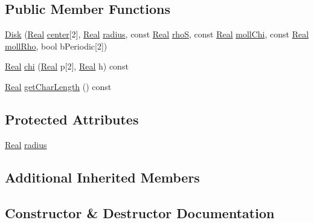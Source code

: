 \subsection*{Public Member Functions}
\begin{DoxyCompactItemize}
\item 
\hyperlink{class_disk_a8402960d71a12fb9e372d3ea1b974b92}{Disk} (\hyperlink{_h_d_f5_dumper_8h_a445a5f0e2a34c9d97d69a3c2d1957907}{Real} \hyperlink{class_shape_a865a04fe67fc785b3cbb44806a214248}{center}\mbox{[}2\mbox{]}, \hyperlink{_h_d_f5_dumper_8h_a445a5f0e2a34c9d97d69a3c2d1957907}{Real} \hyperlink{class_disk_ae6a9adac6c5dd96d63d0a3345f90499d}{radius}, const \hyperlink{_h_d_f5_dumper_8h_a445a5f0e2a34c9d97d69a3c2d1957907}{Real} \hyperlink{class_shape_a181acdc3063f20a15ba1807f7b6a5d10}{rho\+S}, const \hyperlink{_h_d_f5_dumper_8h_a445a5f0e2a34c9d97d69a3c2d1957907}{Real} \hyperlink{class_shape_ad7d270a8ffc4056d4990424dffdd0488}{moll\+Chi}, const \hyperlink{_h_d_f5_dumper_8h_a445a5f0e2a34c9d97d69a3c2d1957907}{Real} \hyperlink{class_shape_af5aa25175d49bc463fada7b11f2735e1}{moll\+Rho}, bool b\+Periodic\mbox{[}2\mbox{]})
\item 
\hyperlink{_h_d_f5_dumper_8h_a445a5f0e2a34c9d97d69a3c2d1957907}{Real} \hyperlink{class_disk_a89a8a1a2c88dd07df5fec2c49e6359b4}{chi} (\hyperlink{_h_d_f5_dumper_8h_a445a5f0e2a34c9d97d69a3c2d1957907}{Real} p\mbox{[}2\mbox{]}, \hyperlink{_h_d_f5_dumper_8h_a445a5f0e2a34c9d97d69a3c2d1957907}{Real} h) const 
\item 
\hyperlink{_h_d_f5_dumper_8h_a445a5f0e2a34c9d97d69a3c2d1957907}{Real} \hyperlink{class_disk_a53a89fd99f0f2e35243622f3c96d7f83}{get\+Char\+Length} () const 
\end{DoxyCompactItemize}
\subsection*{Protected Attributes}
\begin{DoxyCompactItemize}
\item 
\hyperlink{_h_d_f5_dumper_8h_a445a5f0e2a34c9d97d69a3c2d1957907}{Real} \hyperlink{class_disk_ae6a9adac6c5dd96d63d0a3345f90499d}{radius}
\end{DoxyCompactItemize}
\subsection*{Additional Inherited Members}


\subsection{Constructor \& Destructor Documentation}
\hypertarget{class_disk_a8402960d71a12fb9e372d3ea1b974b92}{}
